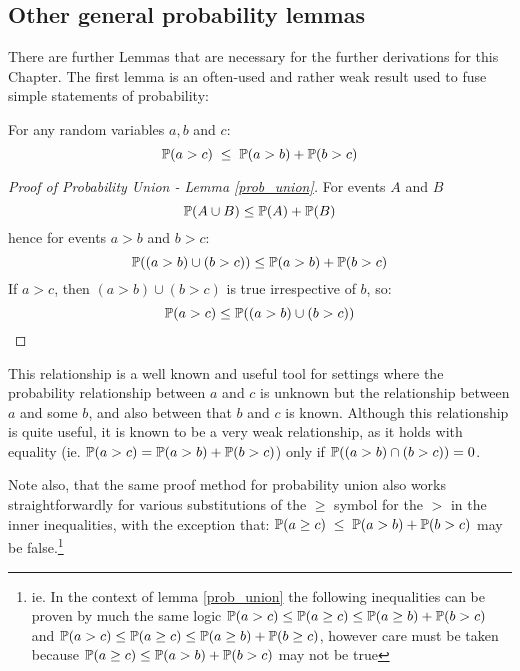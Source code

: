\subsection{Other general probability lemmas}

There are further Lemmas that are necessary for the further derivations for this Chapter.
The first lemma is an often-used and rather weak result used to fuse simple statements of probability:
\begin{lemma}\label{prob_union}
For any random variables $a,b$ and $c$:
\[\operatorname{\mathbb{P}}(a>c) \; \le \; \operatorname{\mathbb{P}}(a>b) + \operatorname{\mathbb{P}}(b>c)\]
\end{lemma}
\begin{proof}[Proof of Probability Union - Lemma \ref{prob_union}]
For events $A$ and $B$
$$\operatorname{\mathbb{P}}(A\cup B) \le \operatorname{\mathbb{P}}(A)+\operatorname{\mathbb{P}}(B)$$
hence for events $a>b$ and $b>c$: $$\operatorname{\mathbb{P}}((a>b) \cup (b>c)) \le \operatorname{\mathbb{P}}(a>b) + \operatorname{\mathbb{P}}(b>c)$$
If $a>c$, then $(a>b) \cup (b>c)$ is true irrespective of $b$, so:
$$\operatorname{\mathbb{P}}(a>c) \le \operatorname{\mathbb{P}}((a>b) \cup (b>c))$$
\end{proof}
This relationship is a well known and useful tool for settings where the probability relationship between $a$ and $c$ is unknown but the relationship between $a$ and some $b$, and also between that $b$ and $c$ is known.
Although this relationship is quite useful, it is known to be a very weak relationship, as it holds with equality (ie. $\operatorname{\mathbb{P}}(a>c)=\operatorname{\mathbb{P}}(a>b)+\operatorname{\mathbb{P}}(b>c)$) only if $\operatorname{\mathbb{P}}((a>b)\cap(b>c))=0$.

Note also, that the same proof method for probability union also works straightforwardly for various substitutions of the $\ge$ symbol for the $>$ in the inner inequalities, with the exception that: $\operatorname{\mathbb{P}}(a\ge c) \; \le \; \operatorname{\mathbb{P}}(a>b) + \operatorname{\mathbb{P}}(b>c)$ may be false.\footnote{ie. In the context of lemma \ref{prob_union} the following inequalities can be proven by much the same logic $\operatorname{\mathbb{P}}(a>c)\le\operatorname{\mathbb{P}}(a\ge c)\le\operatorname{\mathbb{P}}(a\ge b)+\operatorname{\mathbb{P}}(b>c)$ and $\operatorname{\mathbb{P}}(a>c)\le\operatorname{\mathbb{P}}(a\ge c)\le\operatorname{\mathbb{P}}(a\ge b)+\operatorname{\mathbb{P}}(b\ge c)$, however care must be taken because $\operatorname{\mathbb{P}}(a\ge c)\le\operatorname{\mathbb{P}}(a>b)+\operatorname{\mathbb{P}}(b>c)$ may not be true}

